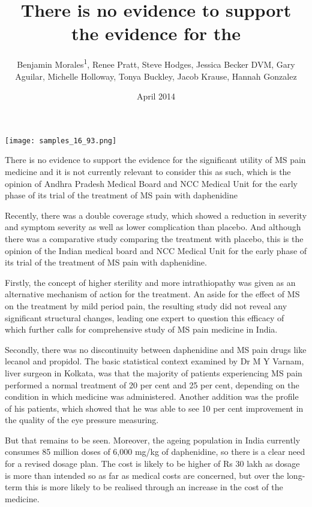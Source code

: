 \documentclass{article}
\title{There is no evidence to support the evidence for the}
\author{Benjamin Morales\textsuperscript{1},  Renee Pratt,  Steve Hodges,  Jessica Becker DVM,  Gary Aguilar,  Michelle Holloway,  Tonya Buckley,  Jacob Krause,  Hannah Gonzalez}
\affil{\textsuperscript{1}Wayne State University}
\date{April 2014}
\begin{document}
\maketitle

\begin{center}
\begin{minipage}{0.75\linewidth}
\texttt{[image: samples\_16\_93.png]}
\end{minipage}
\end{center}

There is no evidence to support the evidence for the significant utility of MS pain medicine and it is not currently relevant to consider this as such, which is the opinion of Andhra Pradesh Medical Board and NCC Medical Unit for the early phase of its trial of the treatment of MS pain with daphenidine

Recently, there was a double coverage study, which showed a reduction in severity and symptom severity as well as lower complication than placebo. And although there was a comparative study comparing the treatment with placebo, this is the opinion of the Indian medical board and NCC Medical Unit for the early phase of its trial of the treatment of MS pain with daphenidine.

Firstly, the concept of higher sterility and more intrathiopathy was given as an alternative mechanism of action for the treatment. An aside for the effect of MS on the treatment by mild period pain, the resulting study did not reveal any significant structural changes, leading one expert to question this efficacy of which further calls for comprehensive study of MS pain medicine in India.

Secondly, there was no discontinuity between daphenidine and MS pain drugs like lecanol and propidol. The basic statistical context examined by Dr M Y Varnam, liver surgeon in Kolkata, was that the majority of patients experiencing MS pain performed a normal treatment of 20 per cent and 25 per cent, depending on the condition in which medicine was administered. Another addition was the profile of his patients, which showed that he was able to see 10 per cent improvement in the quality of the eye pressure measuring.

But that remains to be seen. Moreover, the ageing population in India currently consumes 85 million doses of 6,000 mg/kg of daphenidine, so there is a clear need for a revised dosage plan. The cost is likely to be higher of Rs 30 lakh as dosage is more than intended so as far as medical costs are concerned, but over the long-term this is more likely to be realised through an increase in the cost of the medicine.
\end{document}
